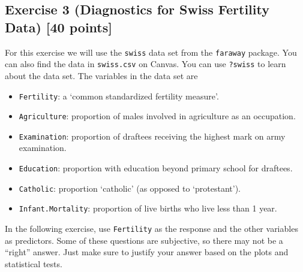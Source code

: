 \documentclass[
]{article}
\providecommand{\tightlist}{%
  \setlength{\itemsep}{0pt}\setlength{\parskip}{0pt}}
\begin{document}
\hypertarget{exercise-3-diagnostics-for-swiss-fertility-data-40-points}{%
\subsection{Exercise 3 (Diagnostics for Swiss Fertility Data) {[}40
points{]}}\label{exercise-3-diagnostics-for-swiss-fertility-data-40-points}}

For this exercise we will use the \texttt{swiss} data set from the
\texttt{faraway} package. You can also find the data in
\texttt{swiss.csv} on Canvas. You can use \texttt{?swiss} to learn about
the data set. The variables in the data set are

\begin{itemize}
\tightlist
\item
  \texttt{Fertility}: a `common standardized fertility measure'.
\item
  \texttt{Agriculture}: proportion of males involved in agriculture as
  an occupation.
\item
  \texttt{Examination}: proportion of draftees receiving the highest
  mark on army examination.
\item
  \texttt{Education}: proportion with education beyond primary school
  for draftees.
\item
  \texttt{Catholic}: proportion `catholic' (as opposed to `protestant').
\item
  \texttt{Infant.Mortality}: proportion of live births who live less
  than 1 year.
\end{itemize}

In the following exercise, use \texttt{Fertility} as the response and
the other variables as predictors. Some of these questions are
subjective, so there may not be a ``right'' answer. Just make sure to
justify your answer based on the plots and statistical tests.
\end{document}
